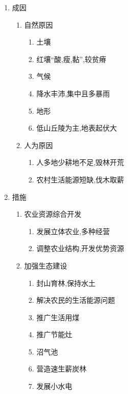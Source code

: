 \documentclass[a4paper]{article}
\begin{document}
    \begin{enumerate}
        \item 成因
        \begin{enumerate}
            \item 自然原因
            \begin{enumerate}
                \item 土壤
                    \item 红壤“酸,瘦,黏”,较贫瘠
                \item 气候
                    \item 降水丰沛,集中且多暴雨
                \item 地形
                    \item 低山丘陵为主,地表起伏大
            \end{enumerate}
            \item 人为原因
            \begin{enumerate}
                \item 人多地少耕地不足,毁林开荒
                \item 农村生活能源短缺,伐木取薪
            \end{enumerate}
        \end{enumerate}
        \item 措施
        \begin{enumerate}
            \item 农业资源综合开发
            \begin{enumerate}
                \item 发展立体农业,多种经营
                \item 调整农业结构,开发优势资源
            \end{enumerate}
            \item 加强生态建设
            \begin{enumerate}
                \item 封山育林,保持水土
                \item 解决农民的生活能源问题
                    \item 推广生活用煤
                    \item 推广节能灶
                    \item 沼气池
                    \item 营造速生薪炭林
                    \item 发展小水电
            \end{enumerate}
        \end{enumerate}
    \end{enumerate}
\end{document}
